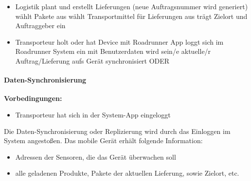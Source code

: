 \begin{appendix}
\begin{itemize}
		\item Logistik plant und erstellt Lieferungen (neue Auftragsnummer wird
			generiert)
			\subitem wählt Pakete aus
			\subitem wählt Transportmittel für Lieferungen aus
			\subitem trägt Zielort und Auftraggeber ein

	  \item Transporteur
	  	\subitem holt oder hat Device mit Roadrunner App
	  	\subitem loggt sich im Roadrunner System ein
	  		\subsubitem mit Benutzerdaten wird sein/e aktuelle/r Auftrag/Lieferung aufs
	  		Gerät synchronisiert ODER 
	\end{itemize}

	\paragraph{Daten-Synchronisierung}
		\textbf{Vorbedingungen: }
		\begin{itemize}
		  \item Transporteur hat sich in der System-App eingeloggt
		\end{itemize}

		Die Daten-Synchronisierung oder Replizierung wird durch das Einloggen im
		System angestoßen. Das mobile Gerät erhält folgende Information:
		\begin{itemize}
		  \item Adressen der Sensoren, die das Gerät überwachen soll
		  \item alle geladenen Produkte, Pakete der aktuellen Lieferung, sowie
				Zielort, etc.
		\end{itemize}
	\par



	
\end{appendix}
